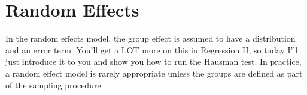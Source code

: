 \documentclass[12pt]{article}
\begin{document}
\begin{stlog}
   \end{stlog}


\section{Random Effects}

In the random effects model, the group effect is assumed to have a
distribution and an error term. You'll get a LOT more on this in
Regression II, so today I'll just introduce it to you and show you how
to run the Hausman test.  In practice, a random effect model is rarely
appropriate unless the groups are defined as part of the sampling
procedure. 
\end{document}
